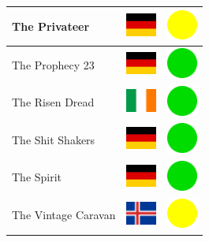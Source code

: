 \documentclass[12pt, a4paper, twoside]{report}
\begin{document}
\begin{center}
\begin{longtable}{|p{5cm}|p{2cm}|p{2cm}|}
 The Privateer                                              & \includegraphics[width=1cm]{../4x3/de} &   \includegraphics[width=1cm]{../likes/m} \\ \hline
 The Prophecy 23                                            & \includegraphics[width=1cm]{../4x3/de} &   \includegraphics[width=1cm]{../likes/y} \\ \hline
 The Risen Dread                                            & \includegraphics[width=1cm]{../4x3/ie} &   \includegraphics[width=1cm]{../likes/y} \\ \hline
 The Shit Shakers                                           & \includegraphics[width=1cm]{../4x3/de} &   \includegraphics[width=1cm]{../likes/y} \\ \hline
 The Spirit                                                 & \includegraphics[width=1cm]{../4x3/de} &   \includegraphics[width=1cm]{../likes/y} \\ \hline
 The Vintage Caravan                                        & \includegraphics[width=1cm]{../4x3/is} &   \includegraphics[width=1cm]{../likes/m} \\ \hline

\end{longtable}
\end{center}
\end{document}
